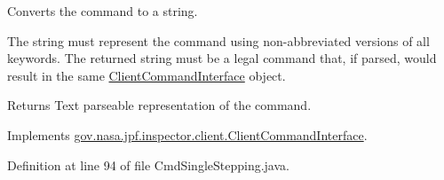 Converts the command to a string. 

The string must represent the command using non-\/abbreviated versions of all keywords. The returned string must be a legal command that, if parsed, would result in the same \hyperlink{interfacegov_1_1nasa_1_1jpf_1_1inspector_1_1client_1_1_client_command_interface}{Client\+Command\+Interface} object.

\begin{DoxyReturn}{Returns}
Text parseable representation of the command. 
\end{DoxyReturn}


Implements \hyperlink{interfacegov_1_1nasa_1_1jpf_1_1inspector_1_1client_1_1_client_command_interface_a393044f5be05c3ab3451b72aeff7af62}{gov.\+nasa.\+jpf.\+inspector.\+client.\+Client\+Command\+Interface}.



Definition at line 94 of file Cmd\+Single\+Stepping.\+java.


